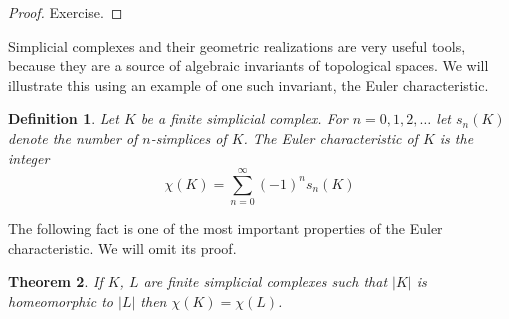 \documentclass[11pt, letterpaper, oneside]{report}
\theoremstyle{pplain}
\newtheorem{theorem}{Theorem}[chapter]
\newtheorem{ITERMVALUE THM}[theorem]{Intermediate Value Theorem}
\newtheorem{HEINEBOREL THM}[theorem]{Heine-Borel Theorem}
\newtheorem{UMETR THM}[theorem]{Urysohn Metrization Theorem}
\newtheorem{UMETR2 THM}[theorem]{Urysohn Metrization Theorem (v.2)}
\theoremstyle{ddefinition}
\newtheorem{definition}[theorem]{Definition}
\theoremstyle{nnn}
\newtheorem{TDA NN}[theorem]{Topological Data Analysis. }
\theoremstyle{eexercise}
\begin{document}
\begin{proof}
Exercise. 
\end{proof}

Simplicial complexes and their geometric realizations are very useful tools, because they are a source of 
algebraic invariants of topological spaces. We will illustrate this using an example of one such invariant, 
the Euler characteristic.


\begin{definition}
Let $K$ be a finite simplicial complex. For $n=0, 1, 2, \dots$ let $s_{n}(K)$ denote the number of $n$-simplices
of $K$. The \emph{Euler characteristic} of $K$ is the integer 
$$\chi(K) = \sum_{n=0}^{\infty} (-1)^{n}s_{n}(K)$$ 
\end{definition}

The following fact is one of the most important properties of the Euler characteristic. We will omit its proof. 

\begin{theorem}
\label{SIMPLICIAL EULER CHAR INVARIANCE  THM}
If $K$, $L$ are finite simplicial complexes such that $|K|$ is homeomorphic to $|L|$ then $\chi(K) = \chi(L)$. 
\end{theorem}
\end{document}
